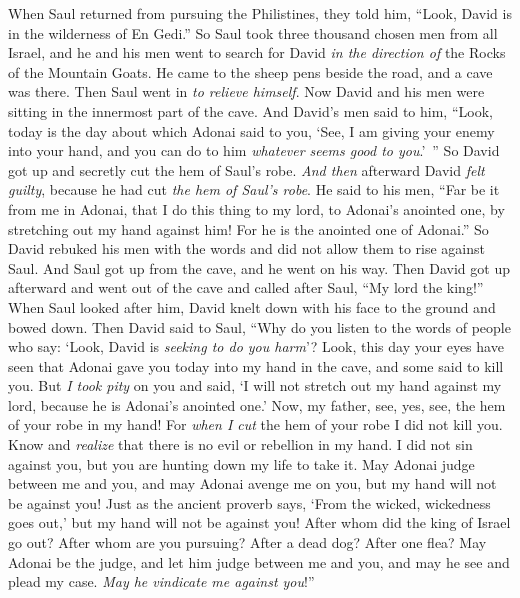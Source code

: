 \begin{biblechapter} %
 When Saul returned from pursuing the Philistines, they told him, “Look, David is in the wilderness of En Gedi.”
\verse So Saul took three thousand chosen men from all Israel, and he and his men went to search for David \textit{in the direction of} the Rocks of the Mountain Goats.
\verse He came to the sheep pens beside the road, and a cave was there. Then Saul went in \textit{to relieve himself}. Now David and his men were sitting in the innermost part of the cave.
\verse And David’s men said to him, “Look, today is the day about which Adonai said to you, ‘See, I am giving your enemy into your hand, and you can do to him \textit{whatever seems good to you}.’ ” So David got up and secretly cut the hem of Saul’s robe.
\verse \textit{And then} afterward David \textit{felt guilty}, because he had cut \textit{the hem of Saul’s robe}.
\verse He said to his men, “Far be it from me in Adonai, that I do this thing to my lord, to Adonai’s anointed one, by stretching out my hand against him! For he is the anointed one of Adonai.”
\verse So David rebuked his men with the words and did not allow them to rise against Saul. And Saul got up from the cave, and he went on his way.
\verse Then David got up afterward and went out of the cave and called after Saul, “My lord the king!” When Saul looked after him, David knelt down with his face to the ground and bowed down.
\verse Then David said to Saul, “Why do you listen to the words of people who say: ‘Look, David is \textit{seeking to do you harm}’?
\verse Look, this day your eyes have seen that Adonai gave you today into my hand in the cave, and some said to kill you. But \textit{I took pity} on you and said, ‘I will not stretch out my hand against my lord, because he is Adonai’s anointed one.’
\verse Now, my father, see, yes, see, the hem of your robe in my hand! For \textit{when I cut} the hem of your robe I did not kill you. Know and \textit{realize} that there is no evil or rebellion in my hand. I did not sin against you, but you are hunting down my life to take it.
\verse May Adonai judge between me and you, and may Adonai avenge me on you, but my hand will not be against you!
\verse Just as the ancient proverb says, ‘From the wicked, wickedness goes out,’ but my hand will not be against you!
\verse After whom did the king of Israel go out? After whom are you pursuing? After a dead dog? After one flea?
\verse May Adonai be the judge, and let him judge between me and you, and may he see and plead my case. \textit{May he vindicate me against you}!”

\end{biblechapter}
